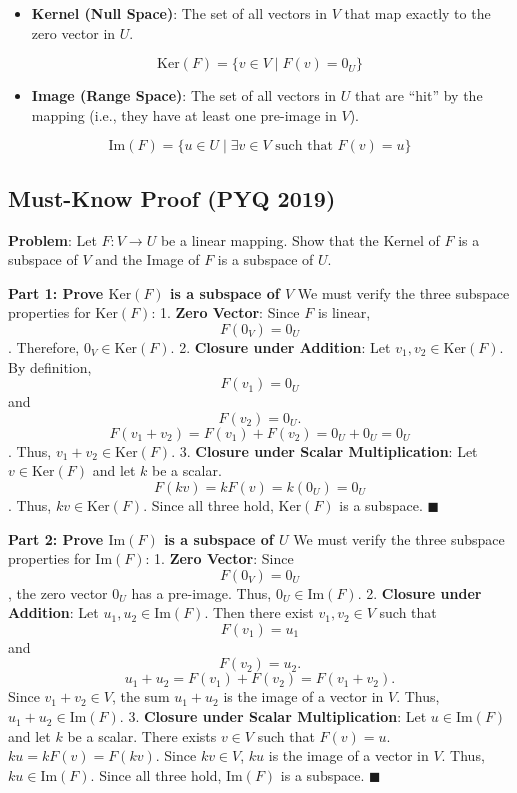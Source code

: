 \documentclass[
]{article}
\providecommand{\tightlist}{%
  \setlength{\itemsep}{0pt}\setlength{\parskip}{0pt}}
\begin{document}
\begin{itemize}
\tightlist
\item
  \textbf{Kernel (Null Space)}: The set of all vectors in \(V\) that map
  exactly to the zero vector in \(U\).
\end{itemize}
\[
\text{Ker}(F) = \lbrace v \in V \mid F(v) = 0_U \rbrace
\]
\begin{itemize}
\tightlist
\item
  \textbf{Image (Range Space)}: The set of all vectors in \(U\) that are
  ``hit'' by the mapping (i.e., they have at least one pre-image in
  \(V\)).
\end{itemize}
\[
\text{Im}(F) = \lbrace u \in U \mid \exists v \in V \text{ such that } F(v) = u \rbrace
\]

\subsection{Must-Know Proof (PYQ
2019)}\label{must-know-proof-pyq-2019-1}

\textbf{Problem}: Let \(F : V \to U\) be a linear mapping. Show that the
Kernel of \(F\) is a subspace of \(V\) and the Image of \(F\) is a
subspace of \(U\).

\textbf{Part 1: Prove \(\text{Ker}(F)\) is a subspace of \(V\)} We must
verify the three subspace properties for \(\text{Ker}(F)\): 1.
\textbf{Zero Vector}: Since \(F\) is linear,
\[
F(0_V) = 0_U
\]
. Therefore, \(0_V \in \text{Ker}(F)\). 2. \textbf{Closure under
Addition}: Let \(v_1, v_2 \in \text{Ker}(F)\). By definition,
\[
F(v_1) = 0_U
\]
and
\[
F(v_2) = 0_U.
\]
\[
F(v_1 + v_2) = F(v_1) + F(v_2) = 0_U + 0_U = 0_U
\]
. Thus, \(v_1 + v_2 \in \text{Ker}(F)\). 3. \textbf{Closure under Scalar
Multiplication}: Let \(v \in \text{Ker}(F)\) and let \(k\) be a scalar.
\[
F(kv) = kF(v) = k(0_U) = 0_U
\]
. Thus, \(kv \in \text{Ker}(F)\). Since all three hold,
\(\text{Ker}(F)\) is a subspace. \(\blacksquare\)

\textbf{Part 2: Prove \(\text{Im}(F)\) is a subspace of \(U\)} We must
verify the three subspace properties for \(\text{Im}(F)\): 1.
\textbf{Zero Vector}: Since
\[
F(0_V) = 0_U
\]
, the zero vector \(0_U\) has a pre-image. Thus,
\(0_U \in \text{Im}(F)\). 2. \textbf{Closure under Addition}: Let
\(u_1, u_2 \in \text{Im}(F)\). Then there exist \(v_1, v_2 \in V\) such
that
\[
F(v_1) = u_1
\]
and
\[
F(v_2) = u_2.
\]
\[
u_1 + u_2 = F(v_1) + F(v_2) = F(v_1 + v_2).
\]
Since \(v_1 + v_2 \in V\), the sum \(u_1 + u_2\) is the image of a
vector in \(V\). Thus, \(u_1 + u_2 \in \text{Im}(F)\). 3.
\textbf{Closure under Scalar Multiplication}: Let \(u \in \text{Im}(F)\)
and let \(k\) be a scalar. There exists \(v \in V\) such that
\(F(v) = u\). \(ku = kF(v) = F(kv)\). Since \(kv \in V\), \(ku\) is the
image of a vector in \(V\). Thus, \(ku \in \text{Im}(F)\). Since all
three hold, \(\text{Im}(F)\) is a subspace. \(\blacksquare\)
\end{document}
